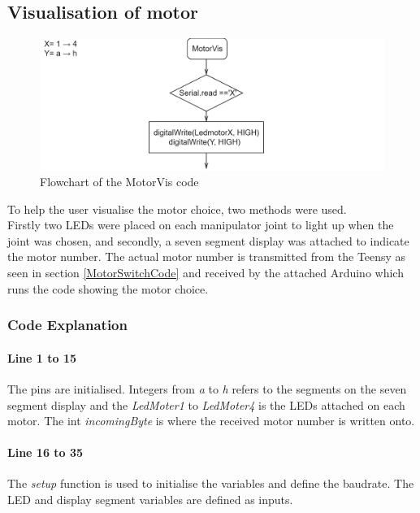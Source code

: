 \subsection*{Visualisation of motor}
\begin{figure}[H]
    \centering
    \includegraphics[width=\textwidth]{Figures/Technical_figures/lyskode.png}
    \caption{Flowchart of the MotorVis code}
    \label{fig:motorvis}
\end{figure}
To help the user visualise the motor choice, two methods were used.\\
Firstly two LEDs were placed on each manipulator joint to light up when the joint was chosen, and secondly, a seven segment display was attached to indicate the motor number.
The actual motor number is transmitted from the Teensy as seen in section \ref{MotorSwitchCode} and received by the attached Arduino which runs the code showing the motor choice.

\subsubsection{Code Explanation}


  

\paragraph{Line 1 to 15} The pins are initialised. Integers from \textit{a} to \textit{h} refers to the segments on the seven segment display and the \textit{LedMoter1} to \textit{LedMoter4} is the LEDs attached on each motor. The int \textit{incomingByte} is where the received motor number is written onto.

\paragraph{Line 16 to 35} The \textit{setup} function is used to initialise the variables and define the baudrate. The LED and display segment variables are defined as inputs.

